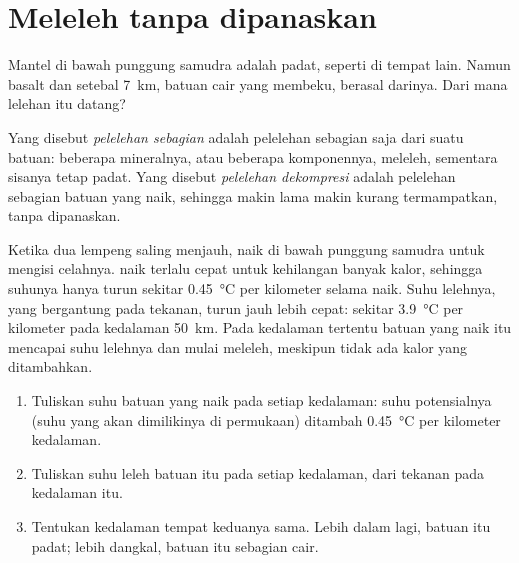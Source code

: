 \section{Meleleh tanpa dipanaskan}

Mantel di bawah punggung samudra adalah  padat, seperti di tempat lain.
Namun basalt dan  setebal \qty{7}{km}, batuan cair yang membeku, berasal
darinya. Dari mana lelehan itu datang?

\begin{definition}\label{def:g11:ocean-ridges:partial-melting}
Yang disebut \emph{pelelehan sebagian} adalah
pelelehan sebagian saja dari suatu batuan: beberapa mineralnya, atau beberapa
komponennya, meleleh, sementara sisanya tetap padat.
Yang disebut \emph{pelelehan dekompresi} adalah
pelelehan sebagian batuan yang naik, sehingga makin lama makin kurang
termampatkan, tanpa dipanaskan.
\end{definition}

Ketika dua lempeng saling menjauh,  naik di bawah punggung samudra
untuk mengisi celahnya.  naik terlalu cepat untuk kehilangan banyak
kalor, sehingga suhunya hanya turun sekitar \qty{0.45}{\celsius} per kilometer
selama naik. Suhu lelehnya, yang bergantung pada tekanan, turun jauh lebih cepat:
sekitar \qty{3.9}{\celsius} per kilometer pada kedalaman \qty{50}{km}. Pada
kedalaman tertentu batuan yang naik itu mencapai suhu lelehnya dan mulai
meleleh, meskipun tidak ada kalor yang ditambahkan.

\begin{method}\label{met:g11:ocean-ridges:melting}
\begin{enumerate}
  \item Tuliskan suhu batuan yang naik pada setiap kedalaman: suhu
        potensialnya (suhu yang akan dimilikinya di permukaan)
        ditambah \qty{0.45}{\celsius} per kilometer kedalaman.
  \item Tuliskan suhu leleh batuan itu pada setiap kedalaman, dari
        tekanan pada kedalaman itu.
  \item Tentukan kedalaman tempat keduanya sama. Lebih dalam lagi, batuan itu
        padat; lebih dangkal, batuan itu sebagian cair.
\end{enumerate}
\end{method}

